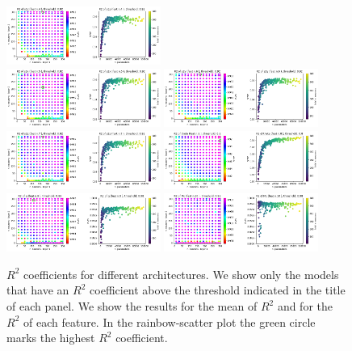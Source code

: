 \documentclass[prd,aps,twocolumn,a4paper,showkeys,nofootinbib]{revtex4-1}
\begin{document}
\begin{figure}[]
  \hspace{0.3cm}
  \includegraphics[width=0.45\textwidth]{./Figs/crossval_v0c0_R2s1z.png} \\
  \includegraphics[width=0.45\textwidth]{./Figs/crossval_v0c0_R2s2x.png} 
  \hspace{0.3cm}
  \includegraphics[width=0.45\textwidth]{./Figs/crossval_v0c0_R2s2y.png} \\
  \includegraphics[width=0.45\textwidth]{./Figs/crossval_v0c0_R2s2z.png} 
  \hspace{0.3cm}
  \includegraphics[width=0.45\textwidth]{./Figs/crossval_v0c0_R2theta.png} \\
  \includegraphics[width=0.45\textwidth]{./Figs/crossval_v0c0_R2q.png} 
  \hspace{0.3cm}
  \includegraphics[width=0.45\textwidth]{./Figs/crossval_v0c0_R2Mc.png} 
  \caption{\label{fig:crossval_v0c0} $R^2$ coefficients for different architectures. 
  We show only the models that have an $R^2$ coefficient
  above the threshold indicated in the title of each panel. We show the results
  for the mean of $R^2$ and for the $R^2$ of each feature. In the rainbow-scatter plot
  the green circle marks the highest $R^2$ coefficient. }
\end{figure}
%
\clearpage
\end{document}
